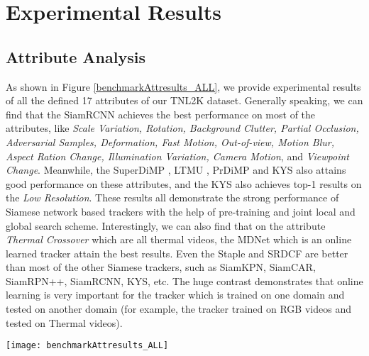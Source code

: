 \documentclass[final]{cvpr}
\begin{document}
\section{Experimental Results}  












 
\subsection{Attribute Analysis } 
As shown in Figure \ref{benchmarkAttresults_ALL}, we provide experimental results of all the defined 17 attributes of our TNL2K dataset. Generally speaking, we can find that the SiamRCNN  \cite{voigtlaender2020siamRCNN} achieves the best performance on most of the attributes, like \emph{Scale Variation, Rotation, Background Clutter, Partial Occlusion, Adversarial Samples, Deformation, Fast Motion, Out-of-view, Motion Blur, Aspect Ration Change, Illumination Variation, Camera Motion}, and \emph{Viewpoint Change}. Meanwhile, the SuperDiMP \cite{bhat2019DiMP}, LTMU \cite{dai2020ltmu}, PrDiMP \cite{danelljan2020PRDiMP} and KYS  \cite{Goutam2020KYS} also attains good performance on these attributes, and the KYS also achieves top-1 results on the \emph{Low Resolution}. These results all demonstrate the strong performance of Siamese network based trackers with the help of pre-training and joint local and global search scheme. Interestingly, we can also find that on the attribute \emph{Thermal Crossover} which are all thermal videos, the MDNet \cite{Nam2015Learning} which is an online learned tracker attain the best results. Even the Staple and SRDCF are better than most of the other Siamese trackers, such as SiamKPN, SiamCAR, SiamRPN++, SiamRCNN, KYS, etc. The huge contrast demonstrates that online learning is very important for the tracker which is trained on one domain and tested on another domain (for example, the tracker trained on RGB videos and tested on Thermal videos). 


\begin{figure*}[!htb]
\center
\texttt{[image: benchmarkAttresults\_ALL]}
\caption{Tracking results under each challenging factors on TNL2K dataset (Tracking-by-BBox). Best viewed by zooming in.}
\label{benchmarkAttresults_ALL}
\end{figure*} 	
\end{document}
